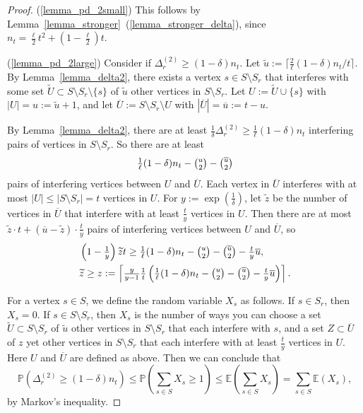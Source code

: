 \documentclass{article}
\theoremstyle{plain}
\theoremstyle{remark}
\theoremstyle{plain}
\numberwithin{equation}{section}
\begin{document}
	\begin{proof}
		(\ref{lemma_pd_2small}) This follows by Lemma~\ref{lemma_stronger}~(\ref{lemma_stronger_delta}), since $n_t=\tfrac{\ell}{2}t^2+(1-\tfrac{\ell}{2})t$.
		
		(\ref{lemma_pd_2large}) Consider if $\Delta_r^{(2)}\geq(1-\delta)n_t$. Let $\widetilde{u}:=\lceil\tfrac{2}{\ell}(1-\delta)n_t/t\rceil$. By Lemma~\ref{lemma_delta2}, there exists a vertex $s\in S\setminus S_r$ that interferes with some set $\widetilde{U}\subset S\setminus S_r\setminus\{s\}$ of $\widetilde{u}$ other vertices in $S\setminus S_r$. Let $U:=\widetilde{U}\cup\{s\}$ with $|U|=u:=\widetilde{u}+1$, and let $\overline{U}:=S\setminus S_r\setminus U$ with $|\overline{U}|=\overline{u}:=t-u$.
		
		By Lemma~\ref{lemma_delta2}, there are at least $\tfrac1{\delta}\Delta_r^{(2)}\geq\tfrac1{\ell}(1-\delta)n_t$ interfering pairs of vertices in $S\setminus S_r$. So there are at least $$\tfrac1{\ell}(1-\delta)n_t-\tbinom{u}{2}-\tbinom{\overline{u}}{2}$$ pairs of interfering vertices between $U$ and $\overline{U}$. Each vertex in $\overline{U}$ interferes with at most $|U|\leq|S\setminus S_r|=t$ vertices in $U$. For $y:=\exp(\tfrac1{\delta})$, let $\widetilde{z}$ be the number of vertices in $\overline{U}$ that interfere with at least $\tfrac{t}{y}$ vertices in $U$. Then there are at most $\widetilde{z}\cdot t+(\overline{u}-\widetilde{z})\cdot\tfrac{t}{y}$ pairs of interfering vertices between $U$ and $\overline{U}$, so
		\begin{align}
			&\left(1-\tfrac1{y}\right)\widetilde{z}t\geq\tfrac1{\ell}(1-\delta)n_t-\tbinom{u}{2}-\tbinom{\overline{u}}{2}-\tfrac{t}{y}\overline{u},
			\\&\widetilde{z}\geq z:=\left\lceil\tfrac{y}{y-1}\tfrac1{t}\left(\tfrac1{\ell}(1-\delta)n_t-\tbinom{u}{2}-\tbinom{\overline{u}}{2}-\tfrac{t}{y}\overline{u}\right)\right\rceil.
		\end{align}
		
		For a vertex $s\in S$, we define the random variable $X_s$ as follows. If $s\in S_r$, then $X_s=0$. If $s\in S\setminus S_r$, then $X_s$ is the number of ways you can choose a set $\widetilde{U}\subset S\setminus S_r$ of $\widetilde{u}$ other vertices in $S\setminus S_r$ that each interfere with $s$, and a set $Z\subset\overline{U}$ of $z$ yet other vertices in $S\setminus S_r$ that each interfere with at least $\tfrac{t}{y}$ vertices in $U$. Here $U$ and $\overline{U}$ are defined as above. Then we can conclude that $$\mathbb{P}(\Delta_r^{(2)}\geq(1-\delta)n_t)\leq\mathbb{P}\left(\sum_{s\in S}X_s\geq1\right)\leq\mathbb{E}\left(\sum_{s\in S}X_s\right)=\sum_{s\in S}\mathbb{E}(X_s),$$ by Markov's inequality.
		

\end{proof}
\end{document}
